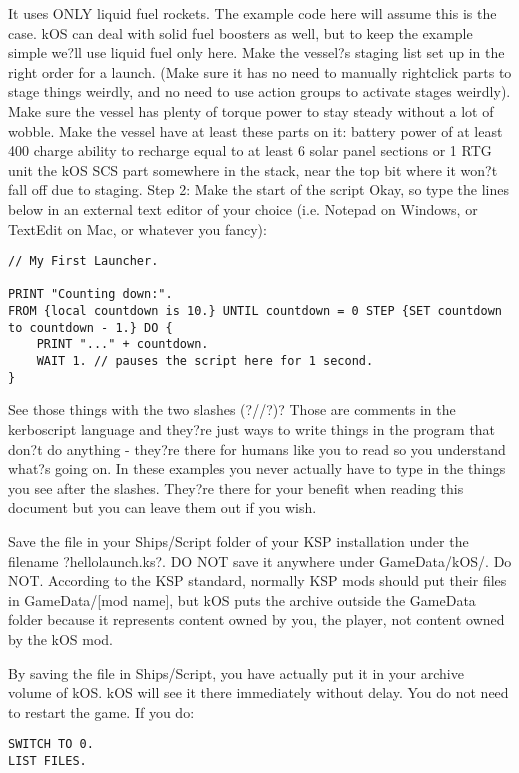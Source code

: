 It uses ONLY liquid fuel rockets. The example code here will assume this is the case. kOS can deal with solid fuel boosters as well, but to keep the example simple we?ll use liquid fuel only here.
Make the vessel?s staging list set up in the right order for a launch. (Make sure it has no need to manually rightclick parts to stage things weirdly, and no need to use action groups to activate stages weirdly).
Make sure the vessel has plenty of torque power to stay steady without a lot of wobble.
Make the vessel have at least these parts on it:
battery power of at least 400 charge
ability to recharge equal to at least 6 solar panel sections or 1 RTG unit
the kOS SCS part somewhere in the stack, near the top bit where it won?t fall off due to staging.
Step 2: Make the start of the script
Okay, so type the lines below in an external text editor of your choice (i.e. Notepad on Windows, or TextEdit on Mac, or whatever you fancy):

\begin{Verbatim}[frame=single]
// My First Launcher.

PRINT "Counting down:".
FROM {local countdown is 10.} UNTIL countdown = 0 STEP {SET countdown to countdown - 1.} DO {
    PRINT "..." + countdown.
    WAIT 1. // pauses the script here for 1 second.
}
\end{Verbatim} 

See those things with the two slashes (?//?)? Those are comments in the kerboscript language and they?re just ways to write things in the program that don?t do anything - they?re there for humans like you to read so you understand what?s going on. In these examples you never actually have to type in the things you see after the slashes. They?re there for your benefit when reading this document but you can leave them out if you wish.

Save the file in your Ships/Script folder of your KSP installation under the filename ?hellolaunch.ks?. DO NOT save it anywhere under GameData/kOS/. Do NOT. According to the KSP standard, normally KSP mods should put their files in GameData/[mod name], but kOS puts the archive outside the GameData folder because it represents content owned by you, the player, not content owned by the kOS mod.

By saving the file in Ships/Script, you have actually put it in your archive volume of kOS. kOS will see it there immediately without delay. You do not need to restart the game. If you do:

\begin{Verbatim}[frame=single]
SWITCH TO 0.
LIST FILES.
\end{Verbatim} 

